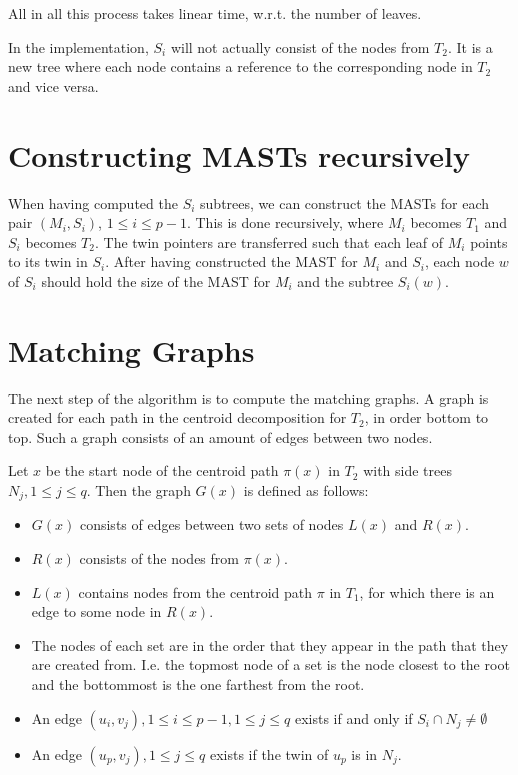 All in all this process takes linear time, w.r.t. the number of leaves.

In the implementation, $S_i$ will not actually consist of the nodes from $T_2$. It is a new tree where each node contains a reference to the corresponding node in $T_2$ and vice versa.

\section{Constructing MASTs recursively}
When having computed the $S_i$ subtrees, we can construct the MASTs for each pair $(M_i, S_i)$, $1 \le i \le p-1$. This is done recursively, where $M_i$ becomes $T_1$ and $S_i$ becomes $T_2$. The twin pointers are transferred such that each leaf of $M_i$ points to its twin in $S_i$. %
After having constructed the MAST for $M_i$ and $S_i$, each node $w$ of $S_i$ should hold the size of the MAST for $M_i$ and the subtree $S_i(w)$. 

\section{Matching Graphs}
The next step of the algorithm is to compute the matching graphs. A graph is created for each path in the centroid decomposition for $T_2$, in order bottom to top. Such a graph consists of an amount of edges between two nodes.

Let $x$ be the start node of the centroid path $\pi(x)$ in $T_2$ with side trees $N_j, 1 \le j \le q$. Then the graph $G(x)$ is defined as follows:

\begin{itemize}
	\item $G(x)$ consists of edges between two sets of nodes $L(x)$ and $R(x)$.
	\item $R(x)$ consists of the nodes from $\pi(x)$.
	\item $L(x)$ contains nodes from the centroid path $\pi$ in $T_1$, for which there is an edge to some node in $R(x)$.
	\item The nodes of each set are in the order that they appear in the path that they are created from. I.e. the topmost node of a set is the node closest to the root and the bottommost is the one farthest from the root.
	\item An edge $(u_i, v_j), 1 \le i \le p-1, 1 \le j \le q$ exists if and only if $S_i \cap N_j \ne \emptyset$
	\item An edge $(u_p, v_j), 1 \le j \le q$ exists if the twin of $u_p$ is in $N_j$.
\end{itemize}

